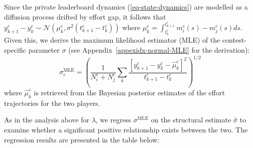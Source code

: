\documentclass[mnsc]{informs3}
\begin{document}
Since the private leaderboard dynamics (\ref{eq-state-dynamics}) are modelled as a diffusion process drifted by effort gap, it follows that $y^c_{k+1} - y^c_{k} \sim \mathcal{N}\left(\mu^c_k, \sigma^2(t^c_{k+1}-t^c_k)\right)$ where $\mu^c_k = \int^{t^c_{k+1}}_{t^c_k}m^c_i(s) - m^c_j(s)ds$. 
Given this, we derive the maximum likelihood estimator (MLE) of the contest-specific parameter $\sigma$ (see Appendix~\ref{appexidx-normal-MLE} for the derivation): 
\begin{equation*}
\sigma^{\text{MLE}}_c = \left(\frac{1}{N^c_i+N^c_j}\sum_k\frac{\left[y^c_{k+1}-y^c_{k}-\hat\mu^c_k\right]^2}{t^c_{k+1}-t^c_k}\right)^{1/2}
\end{equation*}
where $\hat\mu^c_k$ is retrieved from the Bayesian posterior estimates of the effort trajectories for the two players.

As in the analysis above for $\lambda$, we regress $\sigma^{\text{MLE}}$ on the structural estimate $\hat{\sigma}$ to examine whether a significant positive relationship exists between the two. 
The regression results are presented in the table below:
\end{document}
